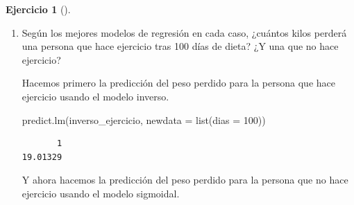 \documentclass[
  a4paper,
]{scrreport}
\newenvironment{Shaded}{\begin{snugshade}}{\end{snugshade}}
\newcommand{\AttributeTok}[1]{\textcolor[rgb]{0.40,0.45,0.13}{#1}}
\newcommand{\DecValTok}[1]{\textcolor[rgb]{0.68,0.00,0.00}{#1}}
\newcommand{\FunctionTok}[1]{\textcolor[rgb]{0.28,0.35,0.67}{#1}}
\newcommand{\NormalTok}[1]{\textcolor[rgb]{0.00,0.23,0.31}{#1}}
\theoremstyle{definition}
\newtheorem{exercise}{Ejercicio}[chapter]
\theoremstyle{remark}
\begin{document}
\begin{exercise}[]
\begin{enumerate}
\begin{tcolorbox}
\begin{verbatim}

Call:
lm(formula = log(peso.perdido) ~ I(1/dias), data = df[df$ejercicio == 
    "no", ])

Residuals:
     Min       1Q   Median       3Q      Max 
-0.66026 -0.07192  0.04678  0.13142  0.29633 

Coefficients:
            Estimate Std. Error t value Pr(>|t|)    
(Intercept)   2.8694     0.1021   28.09 2.55e-16 ***
I(1/dias)   -24.4226     3.4111   -7.16 1.15e-06 ***
---
Signif. codes:  0 '***' 0.001 '**' 0.01 '*' 0.05 '.' 0.1 ' ' 1

Residual standard error: 0.2417 on 18 degrees of freedom
Multiple R-squared:  0.7401,    Adjusted R-squared:  0.7257 
F-statistic: 51.26 on 1 and 18 DF,  p-value: 1.146e-06
\end{verbatim}

  \end{tcolorbox}
\item
  Según los mejores modelos de regresión en cada caso, ¿cuántos kilos
  perderá una persona que hace ejercicio tras 100 días de dieta? ¿Y una
  que no hace ejercicio?

  \begin{tcolorbox}[enhanced jigsaw, breakable, toptitle=1mm, colbacktitle=quarto-callout-tip-color!10!white, rightrule=.15mm, opacityback=0, opacitybacktitle=0.6, titlerule=0mm, coltitle=black, colframe=quarto-callout-tip-color-frame, colback=white, bottomtitle=1mm, leftrule=.75mm, toprule=.15mm, title=\textcolor{quarto-callout-tip-color}{\faLightbulb}\hspace{0.5em}{Solución}, arc=.35mm, bottomrule=.15mm, left=2mm]

  Hacemos primero la predicción del peso perdido para la persona que
  hace ejercicio usando el modelo inverso.

\begin{Shaded}
\begin{Highlighting}[]
\FunctionTok{predict.lm}\NormalTok{(inverso\_ejercicio, }\AttributeTok{newdata =} \FunctionTok{list}\NormalTok{(}\AttributeTok{dias =} \DecValTok{100}\NormalTok{))}
\end{Highlighting}
\end{Shaded}

\begin{verbatim}
       1 
19.01329 
\end{verbatim}

  Y ahora hacemos la predicción del peso perdido para la persona que no
  hace ejercicio usando el modelo sigmoidal.


\end{tcolorbox}
\end{enumerate}
\end{exercise}
\end{document}
